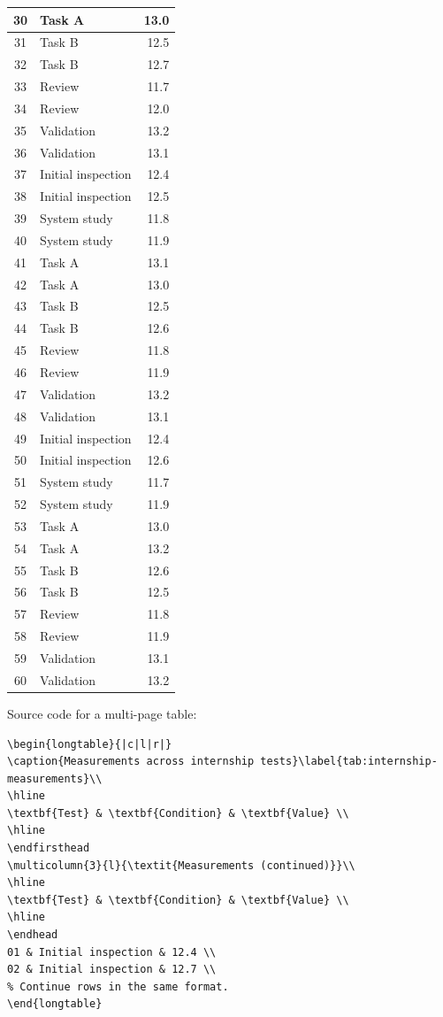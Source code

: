 {\begin{longtable}{|c|l|r|}
30 & Task A & 13.0 \\\hline
31 & Task B & 12.5 \\\hline
32 & Task B & 12.7 \\\hline
33 & Review & 11.7 \\\hline
34 & Review & 12.0 \\\hline
35 & Validation & 13.2 \\\hline
36 & Validation & 13.1 \\\hline
37 & Initial inspection & 12.4 \\\hline
38 & Initial inspection & 12.5 \\\hline
39 & System study & 11.8 \\\hline
40 & System study & 11.9 \\\hline
41 & Task A & 13.1 \\\hline
42 & Task A & 13.0 \\\hline
43 & Task B & 12.5 \\\hline
44 & Task B & 12.6 \\\hline
45 & Review & 11.8 \\\hline
46 & Review & 11.9 \\\hline
47 & Validation & 13.2 \\\hline
48 & Validation & 13.1 \\\hline
49 & Initial inspection & 12.4 \\\hline
50 & Initial inspection & 12.6 \\\hline
51 & System study & 11.7 \\\hline
52 & System study & 11.9 \\\hline
53 & Task A & 13.0 \\\hline
54 & Task A & 13.2 \\\hline
55 & Task B & 12.6 \\\hline
56 & Task B & 12.5 \\\hline
57 & Review & 11.8 \\\hline
58 & Review & 11.9 \\\hline
59 & Validation & 13.1 \\\hline
60 & Validation & 13.2 \\\hline
\end{longtable}

Source code for a multi-page table:

\begin{verbatim}
\begin{longtable}{|c|l|r|}
\caption{Measurements across internship tests}\label{tab:internship-measurements}\\
\hline
\textbf{Test} & \textbf{Condition} & \textbf{Value} \\
\hline
\endfirsthead
\multicolumn{3}{l}{\textit{Measurements (continued)}}\\
\hline
\textbf{Test} & \textbf{Condition} & \textbf{Value} \\
\hline
\endhead
01 & Initial inspection & 12.4 \\
02 & Initial inspection & 12.7 \\
% Continue rows in the same format.
\end{longtable}
\end{verbatim}

}
